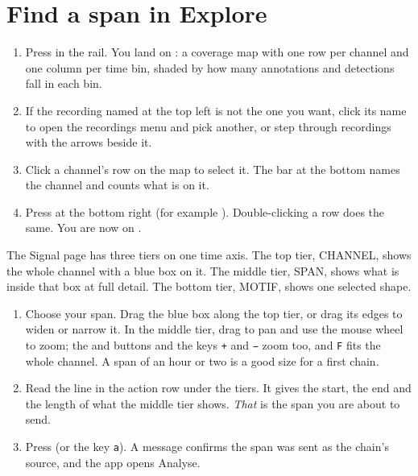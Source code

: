 \section{Find a span in Explore}\label{sec:first-session-explore}
\begin{enumerate}
  \item Press  in the rail. You land on : a coverage
    map with one row per channel and one column per time bin, shaded by how many annotations
    and detections fall in each bin.
  \item If the recording named at the top left is not the one you want, click its name to
    open the recordings menu and pick another, or step through recordings with the arrows
    beside it.
  \item Click a channel's row on the map to select it. The bar at the bottom names the
    channel and counts what is on it.
  \item Press  at the bottom right (for example ).
    Double-clicking a row does the same. You are now on .
\end{enumerate}


The Signal page has three tiers on one time axis. The top tier, \textsf{CHANNEL}, shows the
whole channel with a blue box on it. The middle tier, \textsf{SPAN}, shows what is inside
that box at full detail. The bottom tier, \textsf{MOTIF}, shows one selected shape.

\begin{enumerate}[resume]
  \item Choose your span. Drag the blue box along the top tier, or drag its edges to widen
    or narrow it. In the middle tier, drag to pan and use the mouse wheel to zoom; the
    \ui{+} and  buttons and the keys \texttt{+} and \texttt{−} zoom too, and
    \texttt{F} fits the whole channel. A span of an hour or two is a good size for a first
    chain.
  \item Read the line  in the action row under the tiers. It gives the
    start, the end and the length of what the middle tier shows. \emph{That} is the span
    you are about to send.
  \item Press  (or the key \texttt{a}). A message confirms the span
    was sent as the chain's source, and the app opens Analyse.
\end{enumerate}

